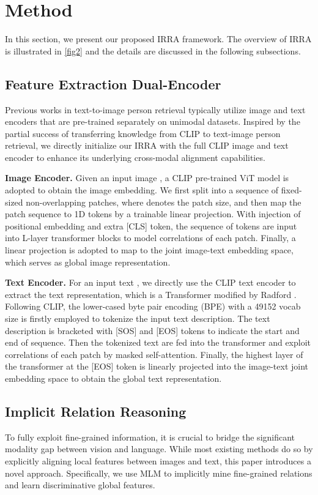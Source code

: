 \documentclass[10pt,twocolumn,letterpaper]{article}
\begin{document}
\section{Method}
In this section, we present our proposed IRRA framework. The overview of IRRA is illustrated in \cref{fig2} and the details are discussed in the following subsections.

\subsection{Feature Extraction Dual-Encoder}
\label{subsec:feature}
Previous works in text-to-image person retrieval typically utilize image and text encoders that are pre-trained separately on unimodal datasets.
Inspired by the partial success of transferring knowledge from CLIP to text-image person retrieval\cite{han2021text}, we directly initialize our IRRA with the full CLIP image and text encoder to enhance its underlying cross-modal alignment capabilities.

\textbf{Image Encoder.} Given an input image , a CLIP pre-trained ViT model is adopted to obtain the image embedding. We first split  into a sequence of  fixed-sized non-overlapping patches, where  denotes the patch size, and then map the patch sequence to 1D tokens  by a trainable linear projection. With injection of positional embedding and extra [CLS] token, the sequence of tokens  are input into L-layer transformer blocks to model correlations of each patch. Finally, a linear projection is adopted to map  to the joint image-text embedding space, which serves as global image representation.

\textbf{Text Encoder.} For an input text , we directly use the CLIP text encoder to extract the text representation, which is a Transformer\cite{vaswani2017attention} modified by Radford \etal \cite{radford2021learning}. Following CLIP, the lower-cased byte pair encoding (BPE) with a 49152 vocab size\cite{sennrich2015neural} is firstly employed to tokenize the input text description. The text description is bracketed with [SOS] and [EOS] tokens to indicate the start and end of sequence. Then the tokenized text  are fed into the transformer and exploit correlations of each patch by masked self-attention. Finally, the highest layer of the transformer at the [EOS] token  is linearly projected into the image-text joint embedding space to obtain the global text representation.

\subsection{Implicit Relation Reasoning}
To fully exploit fine-grained information, it is crucial to bridge the significant modality gap between vision and language.
While most existing methods do so by explicitly aligning local features between images and text, this paper introduces a novel approach. Specifically, we use MLM to implicitly mine fine-grained relations and learn discriminative global features. 
\end{document}
